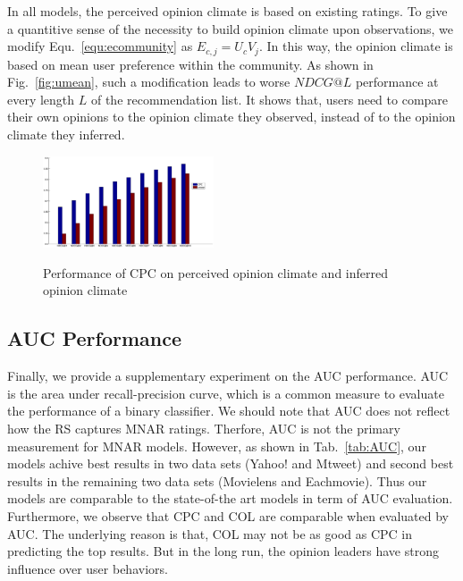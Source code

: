 \documentclass[sigconf]{acmart}
\begin{document}
In all models, the perceived opinion climate is based on existing ratings. To give a quantitive sense of the necessity to build opinion climate upon observations, we modify Equ.~\ref{equ:ecommunity} as $E_{c,j}=U_cV_j$. In this way, the opinion climate is based on mean user preference within the community.  As shown in Fig.~\ref{fig:umean}, such a modification leads to worse $NDCG@L$ performance at every length $L$ of the recommendation list. It shows that, users need to compare their own opinions to the opinion climate they observed, instead of to the opinion climate they inferred.

\begin{figure}[htbp]
\begin{center}
\includegraphics[width=0.45\textwidth]{fig15_umean.eps}
\caption{Performance of CPC on perceived opinion climate and inferred opinion climate}\label{fig:umean}
\label{default}
\end{center}
\end{figure}



\subsection{AUC Performance}
Finally, we provide a supplementary experiment on the AUC performance. AUC is the area under recall-precision curve, which is a common measure to evaluate the performance of a binary classifier. We should note that AUC does not reflect how the RS captures MNAR ratings. Therfore, AUC is not the primary measurement for MNAR models. However, as shown in Tab.~\ref{tab:AUC}, our models achive best results in two data sets (Yahoo! and Mtweet) and second best results in the remaining two data sets (Movielens and Eachmovie). Thus our models are comparable to the state-of-the art models in term of AUC evaluation. Furthermore, we observe that CPC and COL are comparable when evaluated by AUC.   The underlying reason is that, COL may not be as good as CPC in predicting the top results. But in the long run, the opinion leaders have strong influence over user behaviors.
\end{document}
